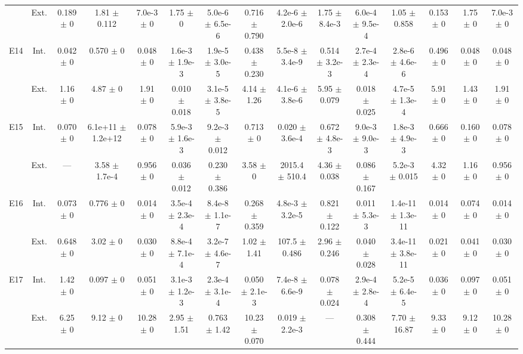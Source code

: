 \begin{table}[htbp]
{\begin{tabular}{@{}ccccccccccccccc@{}}
 & Ext. & 0.189 $\pm$ 0 & 1.81 $\pm$ 0.112 & 7.0e-3 $\pm$ 0 & 1.75 $\pm$ 0 & 5.0e-6 $\pm$ 6.5e-6 & 0.716 $\pm$ 0.790 & 4.2e-6 $\pm$ 2.0e-6 & 1.75 $\pm$ 8.4e-3 & 6.0e-4 $\pm$ 9.5e-4 & 1.05 $\pm$ 0.858 & 0.153 $\pm$ 0 & 1.75 $\pm$ 0 & 7.0e-3 $\pm$ 0 \\
\cline{2-15}
\multirow{2}{*}{E14} & Int. & 0.042 $\pm$ 0 & 0.570 $\pm$ 0 & 0.048 $\pm$ 0 & 1.6e-3 $\pm$ 1.9e-3 & 1.9e-5 $\pm$ 3.0e-5 & 0.438 $\pm$ 0.230 & 5.5e-8 $\pm$ 3.4e-9 & 0.514 $\pm$ 3.2e-3 & 2.7e-4 $\pm$ 2.3e-4 & 2.8e-6 $\pm$ 4.6e-6 & 0.496 $\pm$ 0 & 0.048 $\pm$ 0 & 0.048 $\pm$ 0 \\
 & Ext. & 1.16 $\pm$ 0 & 4.87 $\pm$ 0 & 1.91 $\pm$ 0 & 0.010 $\pm$ 0.018 & 3.1e-5 $\pm$ 3.8e-5 & 4.14 $\pm$ 1.26 & 4.1e-6 $\pm$ 3.8e-6 & 5.95 $\pm$ 0.079 & 0.018 $\pm$ 0.025 & 4.7e-5 $\pm$ 1.3e-4 & 5.91 $\pm$ 0 & 1.43 $\pm$ 0 & 1.91 $\pm$ 0 \\
\cline{2-15}
\multirow{2}{*}{E15} & Int. & 0.070 $\pm$ 0 & 6.1e+11 $\pm$ 1.2e+12 & 0.078 $\pm$ 0 & 5.9e-3 $\pm$ 1.6e-3 & 9.2e-3 $\pm$ 0.012 & 0.713 $\pm$ 0 & 0.020 $\pm$ 3.6e-4 & 0.672 $\pm$ 4.8e-3 & 9.0e-3 $\pm$ 9.0e-3 & 1.8e-3 $\pm$ 4.9e-3 & 0.666 $\pm$ 0 & 0.160 $\pm$ 0 & 0.078 $\pm$ 0 \\
 & Ext. & --- & 3.58 $\pm$ 1.7e-4 & 0.956 $\pm$ 0 & 0.036 $\pm$ 0.012 & 0.230 $\pm$ 0.386 & 3.58 $\pm$ 0 & 2015.4 $\pm$ 510.4 & 4.36 $\pm$ 0.038 & 0.086 $\pm$ 0.167 & 5.2e-3 $\pm$ 0.015 & 4.32 $\pm$ 0 & 1.16 $\pm$ 0 & 0.956 $\pm$ 0 \\
\cline{2-15}
\multirow{2}{*}{E16} & Int. & 0.073 $\pm$ 0 & 0.776 $\pm$ 0 & 0.014 $\pm$ 0 & 3.5e-4 $\pm$ 2.3e-4 & 8.4e-8 $\pm$ 1.1e-7 & 0.268 $\pm$ 0.359 & 4.8e-3 $\pm$ 3.2e-5 & 0.821 $\pm$ 0.122 & 0.011 $\pm$ 5.3e-3 & 1.4e-11 $\pm$ 1.3e-11 & 0.014 $\pm$ 0 & 0.074 $\pm$ 0 & 0.014 $\pm$ 0 \\
 & Ext. & 0.648 $\pm$ 0 & 3.02 $\pm$ 0 & 0.030 $\pm$ 0 & 8.8e-4 $\pm$ 7.1e-4 & 3.2e-7 $\pm$ 4.6e-7 & 1.02 $\pm$ 1.41 & 107.5 $\pm$ 0.486 & 2.96 $\pm$ 0.246 & 0.040 $\pm$ 0.028 & 3.4e-11 $\pm$ 3.8e-11 & 0.021 $\pm$ 0 & 0.041 $\pm$ 0 & 0.030 $\pm$ 0 \\
\cline{2-15}
\multirow{2}{*}{E17} & Int. & 1.42 $\pm$ 0 & 0.097 $\pm$ 0 & 0.051 $\pm$ 0 & 3.1e-3 $\pm$ 1.2e-3 & 2.3e-4 $\pm$ 3.1e-4 & 0.050 $\pm$ 2.1e-3 & 7.4e-8 $\pm$ 6.6e-9 & 0.078 $\pm$ 0.024 & 2.9e-4 $\pm$ 2.8e-4 & 5.2e-5 $\pm$ 6.4e-5 & 0.036 $\pm$ 0 & 0.097 $\pm$ 0 & 0.051 $\pm$ 0 \\
 & Ext. & 6.25 $\pm$ 0 & 9.12 $\pm$ 0 & 10.28 $\pm$ 0 & 2.95 $\pm$ 1.51 & 0.763 $\pm$ 1.42 & 10.23 $\pm$ 0.070 & 0.019 $\pm$ 2.2e-3 & --- & 0.308 $\pm$ 0.444 & 7.70 $\pm$ 16.87 & 9.33 $\pm$ 0 & 9.12 $\pm$ 0 & 10.28 $\pm$ 0 \\

\end{tabular}}
\end{table}
